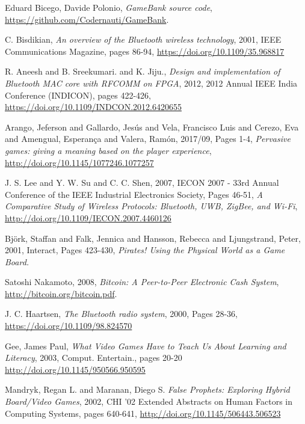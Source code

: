 %
%
%
\begin{thebibliography}{1}
  
  Eduard Bicego, Davide Polonio,
  \emph{GameBank source code},
  \url{https://github.com/Codernauti/GameBank}.
  
  C. Bisdikian,
  \emph{An overview of the Bluetooth wireless technology},
  2001,
  IEEE Communications Magazine, pages 86-94,
  \url{https://doi.org/10.1109/35.968817}

  R. Aneesh and B. Sreekumari. and K. Jiju.,
  \emph{Design and implementation of Bluetooth MAC core with RFCOMM on FPGA},
  2012,
  2012 Annual IEEE India Conference (INDICON), pages 422-426,
  \url{https://doi.org/10.1109/INDCON.2012.6420655}

  Arango, Jeferson and Gallardo, Jesús and Vela, Francisco Luis and Cerezo, Eva 
and Amengual, Esperança and Valera, Ramón,
  2017/09,
  Pages 1-4,
  \emph{Pervasive games: giving a meaning based on the player experience},
  \url{http://doi.org/10.1145/1077246.1077257}
  
  J. S. Lee and Y. W. Su and C. C. Shen,
  2007,
  IECON 2007 - 33rd Annual Conference of the IEEE Industrial Electronics 
Society, Pages 46-51,
  \emph{A Comparative Study of Wireless Protocols: Bluetooth, UWB, ZigBee, and 
Wi-Fi},
  \url{http://doi.org/10.1109/IECON.2007.4460126}
  
  Bj{\"o}rk, Staffan and Falk, Jennica and Hansson, Rebecca and Ljungstrand, 
Peter,
  2001,
  Interact, Pages 423-430,
  \emph{Pirates! Using the Physical World as a Game Board.}
  
  Satoshi Nakamoto,
  2008,
  \emph{Bitcoin: A Peer-to-Peer Electronic Cash System},
  \url{http://bitcoin.org/bitcoin.pdf}.
  
  J. C. Haartsen,
  \emph{The Bluetooth radio system},
  2000,
  Pages 28-36,
  \url{https://doi.org/10.1109/98.824570}

  Gee, James Paul,
  \emph{What Video Games Have to Teach Us About Learning and Literacy},
  2003,
  Comput. Entertain., pages 20-20
  \url{http://doi.org/10.1145/950566.950595}
  
  Mandryk, Regan L. and Maranan, Diego S.
  \emph{False Prophets: Exploring Hybrid Board/Video Games},
  2002,
  CHI '02 Extended Abstracts on Human Factors in Computing Systems, pages 
640-641,
  \url{http://doi.org/10.1145/506443.506523}
  
\end{thebibliography}